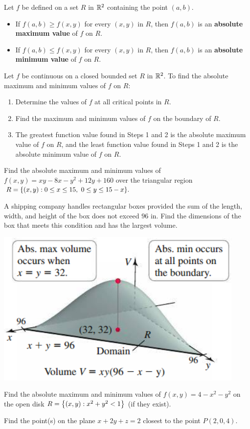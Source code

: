 \documentclass[../mathNotesPreamble]{subfiles}
\begin{document}
  \begin{defn*}
    Let $f$ be defined on a set $R$ in $\mathbb{R}^2$ containing the point $(a,b)$. 
    \begin{itemize}
      \item 
        If $f(a,b)\geq f(x,y)$ for every $(x,y)$ in $R$, then $f(a,b)$ is an \textbf{absolute maximum value} of $f$ on $R$.
      \item 
        If $f(a,b)\leq f(x,y)$ for every $(x,y)$ in $R$, then $f(a,b)$ is an \textbf{absolute minimum value} of $f$ on $R$.
    \end{itemize}
  \end{defn*}
  \begin{thmBox*}
    Let $f$ be continuous on a closed bounded set $R$ in $\mathbb{R}^2$. To find the absolute maximum and minimum values of $f$ on $R$:
    \begin{enumerate}
      \item 
        Determine the values of $f$ at all critical points in $R$.
      \item 
        Find the maximum and minimum values of $f$ on the boundary of $R$.
      \item 
        The greatest function value found in Steps 1 and 2 is the absolute maximum value of $f$ on $R$, and the least function value found in Steps 1 and 2 is the absolute minimum value of $f$ on $R$.
    \end{enumerate}
  \end{thmBox*}
  \pagebreak

  \begin{ex*}
    Find the absolute maximum and minimum values of $f(x,y)=xy-8x-y^2+12y+160$ over the triangular region $R={\left\{(x,y): 0\leq x\leq 15,\ 0\leq y\leq 15-x\right\}}.$
  \end{ex*}
  \pagebreak

  \begin{ex*}
    A shipping company handles rectangular boxes provided the sum of the length, width, and height of the box does not exceed $96$ in. Find the dimensions of the box that meets this condition and has the largest volume.
  \end{ex*}
  \begin{flushright}
    \includegraphics[width=0.4\linewidth]{../images/briggs_15_07/fig15_73}
  \end{flushright}
  \pagebreak

  \begin{ex*}
    Find the absolute maximum and minimum values of $f(x,y)=4-x^2-y^2$ on the open disk $R={\left\{(x,y): x^2+y^2<1\right\}}$ (if they exist).
  \end{ex*}
  \pagebreak

  \begin{ex*}
    Find the point(s) on the plane $x+2y+z=2$ closest to the point $P(2,0,4)$.
  \end{ex*}
  \pagebreak
  
\end{document}
